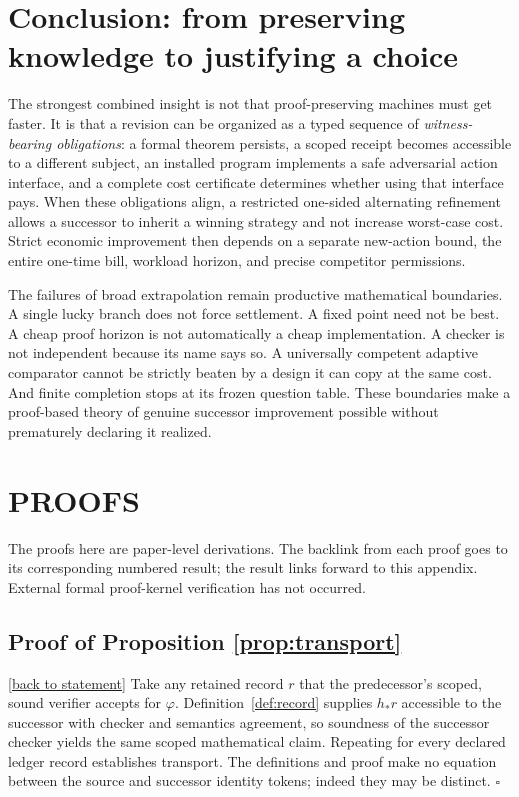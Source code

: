 \documentclass[11pt,letterpaper]{article}
\theoremstyle{definition}
\theoremstyle{remark}
\newcommand{\backlink}[1]{\hyperlink{claim:#1}{\footnotesize[back to statement]}}
\begin{document}
\section{Conclusion: from preserving knowledge to justifying a choice}
The strongest combined insight is not that proof-preserving machines must get faster. It is that a revision can be organized as a typed sequence of \emph{witness-bearing obligations}: a formal theorem persists, a scoped receipt becomes accessible to a different subject, an installed program implements a safe adversarial action interface, and a complete cost certificate determines whether using that interface pays. When these obligations align, a restricted one-sided alternating refinement allows a successor to inherit a winning strategy and not increase worst-case cost. Strict economic improvement then depends on a separate new-action bound, the entire one-time bill, workload horizon, and precise competitor permissions.

The failures of broad extrapolation remain productive mathematical boundaries. A single lucky branch does not force settlement. A fixed point need not be best. A cheap proof horizon is not automatically a cheap implementation. A checker is not independent because its name says so. A universally competent adaptive comparator cannot be strictly beaten by a design it can copy at the same cost. And finite completion stops at its frozen question table. These boundaries make a proof-based theory of genuine successor improvement possible without prematurely declaring it realized.

\appendix
\section*{PROOFS}
\noindent The proofs here are paper-level derivations. The backlink from each proof goes to its corresponding numbered result; the result links forward to this appendix. External formal proof-kernel verification has not occurred.

\hypertarget{proof:transport}{}\subsection*{Proof of Proposition \ref{prop:transport}}\backlink{transport}
Take any retained record $r$ that the predecessor's scoped, sound verifier accepts for $\varphi$. Definition~\ref{def:record} supplies $h_*r$ accessible to the successor with checker and semantics agreement, so soundness of the successor checker yields the same scoped mathematical claim. Repeating for every declared ledger record establishes transport. The definitions and proof make no equation between the source and successor identity tokens; indeed they may be distinct. $\square$
\end{document}

